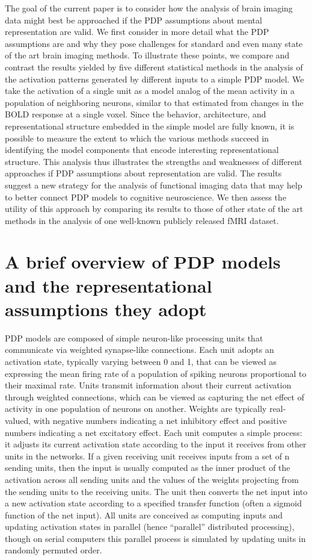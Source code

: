 The goal of the current paper is to consider how the analysis of brain imaging data might best be approached if the PDP assumptions about mental representation are valid. We first consider in more detail what the PDP assumptions are and why they pose challenges for standard and even many state of the art brain imaging methods. To illustrate these points, we compare and contrast the results yielded by five different statistical methods in the analysis of the activation patterns generated by different inputs to a simple PDP model. We take the activation of a single unit as a model analog of the mean activity in a population of neighboring neurons, similar to that estimated from changes in the BOLD response at a single voxel. Since the behavior, architecture, and representational structure embedded in the simple model are fully known, it is possible to measure the extent to which the various methods succeed in identifying the model components that encode interesting representational structure. This analysis thus illustrates the strengths and weaknesses of different approaches if PDP assumptions about representation are valid. The results suggest a new strategy for the analysis of functional imaging data that may help to better connect PDP models to cognitive neuroscience. We then assess the utility of this approach by comparing its results to those of other state of the art methods in the analysis of one well-known publicly released fMRI dataset.

\section{A brief overview of PDP models and the representational assumptions they adopt}
PDP models are composed of simple neuron-like processing units that communicate via weighted synapse-like connections. Each unit adopts an activation state, typically varying between 0 and 1, that can be viewed as expressing the mean firing rate of a population of spiking neurons proportional to their maximal rate. Units transmit information about their current activation through weighted connections, which can be viewed as capturing the net effect of activity in one population of neurons on another. Weights are typically real-valued, with negative numbers indicating a net inhibitory effect and positive numbers indicating a net excitatory effect. Each unit computes a simple process: it adjusts its current activation state according to the input it receives from other units in the networks. If a given receiving unit receives inputs from a set of n sending units, then the input is usually computed as the inner product of the activation across all sending units and the values of the weights projecting from the sending units to the receiving units. The unit then converts the net input into a new activation state according to a specified transfer function (often a sigmoid function of the net input). All units are conceived as computing inputs and updating activation states in parallel (hence ``parallel'' distributed processing), though on serial computers this parallel process is simulated by updating units in randomly permuted order.


